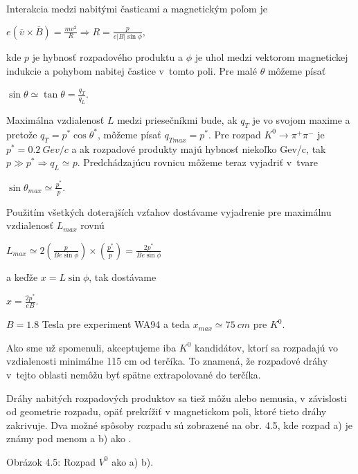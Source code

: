 Interakcia medzi nabitými časticami a magnetickým poľom je
\begin{center}
  $e(\overline{\upsilon} \times \overline{B}) = \frac{mv^{2}}{R} \Rightarrow
  R=\frac{p}{e|B|\sin\phi},$
\end{center}
kde $p$ je hybnosť rozpadového produktu a $\phi$ je uhol medzi vektorom
magnetickej indukcie a pohybom nabitej častice v~tomto poli. Pre malé
$\theta$ môžeme písať
\begin{center}
  $\sin\theta \simeq \tan\theta = \frac{q_{T}}{q_{L}}$.
\end{center}
Maximálna vzdialenosť $L$ medzi priesečníkmi bude, ak $q_{T}$ je vo svojom
maxime a pretože $q_{T}=p^{*}\cos\theta^{*}$, môžeme písať $q_{Tmax}=p^{*}$.
Pre rozpad $K^{0}\longrightarrow \pi^{+} \pi^{-}$ je $p^{*}=0.2\: Gev/c$ a
ak rozpadové produkty majú hybnosť niekoľko Gev/c, tak  $p\gg p^{*}
\Rightarrow q_{L} \simeq p$. Predchádzajúcu rovnicu môžeme teraz vyjadriť
v~tvare
\begin{center}
  $\sin\theta_{max}\simeq\frac{p^{*}}{p}$.
\end{center}
Použitím všetkých doterajších vzťahov dostávame vyjadrenie pre maximálnu
vzdialenosť $L_{max}$ rovnú
\begin{center}
  $L_{max}\simeq2(\frac{p}{Be\sin\phi})\times(\frac{p^{*}}{p}) =
  \frac{2p^{*}}{Be\sin\phi}$
\end{center}
a keďže $x=L\sin\phi$, tak dostávame
\begin{center}
  $x=\frac{2p^{*}}{eB}$.
\end{center}
$B = 1.8$ Tesla pre experiment WA94  a teda $x_{max}\simeq 75\: cm$  pre
$K^{0}$.

Ako sme už spomenuli, akceptujeme iba $K^{0}$ kandidátov, ktorí sa
rozpadajú vo vzdialenosti minimálne  115 cm od terčíka. To znamená, že
rozpadové dráhy v~tejto oblasti nemôžu byť spätne extrapolované do
terčíka.

Dráhy  nabitých rozpadových produktov sa tiež môžu alebo nemusia, v
závislosti od geometrie rozpadu, opäť prekrížiť v magnetickom poli, ktoré
tieto dráhy zakrivuje. Dva možné spôsoby rozpadu sú zobrazené na obr. 4.5,
kde rozpad a) je známy pod menom  a b) ako .

\begin{center}
  \hspace*{-2.5cm}
  
\end{center}
\vspace*{-8cm}
\begin{center}
  Obrázok 4.5: Rozpad $V^{0}$ ako a)  b).
\end{center}

